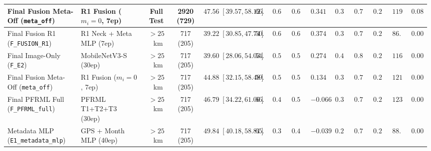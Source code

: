 \documentclass[conference]{IEEEtran}
\begin{document}
\begin{table}[t]
{\begin{tabular}{llcccccccccccc}
      Final Fusion Meta-Off (\texttt{meta\_off}) & R1 Fusion ($m_i = 0$, 7ep)       &      Full Test      &           2920 (729)            &     $47.56\;[39.57, 58.12]$      &     $66.12$      &     $0.6936$      &     $0.6757$      &      $0.3411$      &     $0.3428$      &             $0.7897$             &     $0.2556$      &     $119.80$     &     $0.0805$      \\
      \midrule
      Final Fusion R1 (\texttt{F\_FUSION\_R1})   & R1 Neck + Meta MLP (7ep)         &      $> 25$~km      &            717 (205)            & $\mathbf{39.22}\;[30.85, 47.74]$ & $\mathbf{50.68}$ & $\mathbf{0.6464}$ & $\mathbf{0.6696}$ & $\mathbf{0.3743}$  &     $0.3473$      &             $0.7741$             &     $0.2352$      & $\mathbf{86.00}$ &     $0.0000$      \\
      Final Image-Only (\texttt{F\_E2})          & MobileNetV3-S (30ep)             &      $> 25$~km      &            717 (205)            &     $39.60\;[28.06, 54.03]$      &     $54.56$      &     $0.5689$      &     $0.5623$      &      $0.2747$      & $\mathbf{0.4003}$ &        $\mathbf{0.8368}$         & $\mathbf{0.2743}$ &     $116.42$     &     $0.0000$      \\
      Final Fusion Meta-Off (\texttt{meta\_off}) & R1 Fusion ($m_i = 0$, 7ep)       &      $> 25$~km      &            717 (205)            &     $44.88\;[32.15, 58.48]$      &     $59.60$      &     $0.5091$      &     $0.5460$      &      $0.1346$      &     $0.3333$      &             $0.7699$             &     $0.2165$      &     $121.83$     &     $0.0000$      \\
      Final PFRML Full (\texttt{F\_PFRML\_full}) & PFRML T1+T2+T3 (30ep)            &      $> 25$~km      &            717 (205)            &     $46.79\;[34.22, 61.06]$      &     $66.14$      &     $0.4121$      &     $0.5082$      &     $-0.0660$      &     $0.3291$      &             $0.7448$             &     $0.2221$      &     $123.82$     &     $0.0000$      \\
      Metadata MLP (\texttt{E1\_metadata\_mlp})  & GPS + Month MLP (40ep)           &      $> 25$~km      &            717 (205)            &     $49.84\;[40.18, 58.81]$      &     $65.31$      &     $0.3797$      &     $0.4954$      &     $-0.0393$      &     $0.2929$      &             $0.7476$             &     $0.2004$      &     $88.83$      &     $0.0000$      \\
      \bottomrule
    \end{tabular}%
  }
\end{table}
\end{document}
